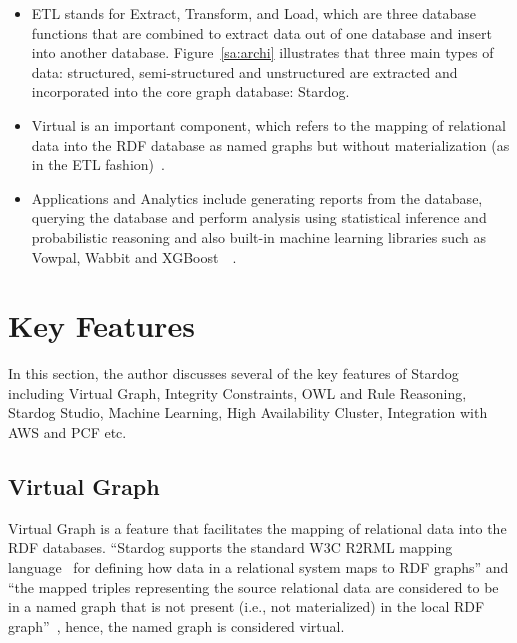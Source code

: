 \begin{itemize}
	\item ETL stands for Extract, Transform, and Load, which are three 
	database functions that are combined to extract data out of one database 
	and insert into another database. Figure~\ref{sa:archi} illustrates that 
	three main types of data: structured, semi-structured and unstructured 
	are extracted and incorporated into the core graph database: Stardog. 
	\item Virtual is an important component, which refers to the mapping of 
	relational data into the RDF database as named graphs but without 
	materialization (as in the ETL 
	fashion)~\cite{hid-sp18-405-blog-stardog-virtual}. 
	\item Applications and Analytics include generating reports from the 
	database, querying the database and perform analysis using statistical 
	inference and probabilistic reasoning and also built-in 
	machine learning libraries such as Vowpal, Wabbit and 
	XGBoost~\cite{hid-sp18-405-blog-stardog-ml}~\cite{hid-sp18-405-blog-stardog-xgboost}.
\end{itemize}

\section{Key Features}
In this section, the author discusses several of the key features of Stardog 
including Virtual Graph, Integrity Constraints, OWL and Rule 
Reasoning, Stardog Studio, Machine Learning, 
High Availability Cluster, Integration with AWS and PCF etc.\

\subsection{Virtual Graph}
Virtual Graph is a feature that facilitates the mapping of relational data into 
the RDF databases. ``Stardog supports the standard W3C R2RML mapping 
language~\cite{hid-sp18-405-www-stardog-r2rml} for defining how data in a 
relational system maps to RDF graphs'' and ``the mapped triples 
representing the source relational data are considered to be in a named 
graph that is not present (i.e., not materialized) in the local RDF 
graph''~\cite{hid-sp18-405-blog-stardog-virtual}, hence, the named graph is 
considered virtual.

